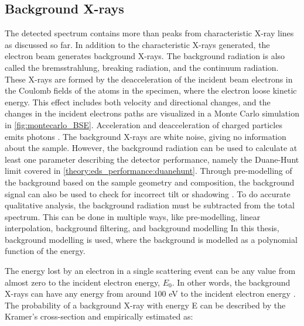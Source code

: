 \subsection{Background X-rays}
\label{theory:xray_formation:background}


The detected spectrum contains more than peaks from characteristic X-ray lines as discussed so far.
In addition to the characteristic X-rays generated, the electron beam generates background X-rays.
The background radiation is also called the bremsstrahlung, breaking radiation, and the continuum radiation.
These X-rays are formed by the deacceleration of the incident beam electrons in the Coulomb fields of the atoms in the specimen, where the electron loose kinetic energy.
This effect includes both velocity and directional changes, and the changes in the incident electrons paths are visualized in a Monte Carlo simulation in \cref{fig:montecarlo_BSE}.
Acceleration and deacceleration of charged particles emits photons \cite{notaros_electromagnetics_2010}.
The background X-rays are white noise, giving no information about the sample.
However, the background radiation can be used to calculate at least one parameter describing the detector performance, namely the Duane-Hunt limit covered in \cref{theory:eds_performance:duanehunt}.
Through pre-modelling of the background based on the sample geometry and composition, the background signal can also be used to check for incorrect tilt or shadowing \cite{edax_insight_2019}.
To do accurate qualitative analysis, the background radiation must be subtracted from the total spectrum.
This can be done in multiple ways, like pre-modelling, linear interpolation, background filtering, and background modelling \cite{liao2006practical}
In this thesis, background modelling is used, where the background is modelled as a polynomial function of the energy.


The energy lost by an electron in a single scattering event can be any value from almost zero to the incident electron energy, $E_0$.
In other words, the background X-rays can have any energy from around $100$ eV to the incident electron energy \cite[Ch. 4.3]{goldstein_scanning_2018}.
The probability of a background X-ray with energy E can be described by the Kramer's cross-section and empirically estimated as:

